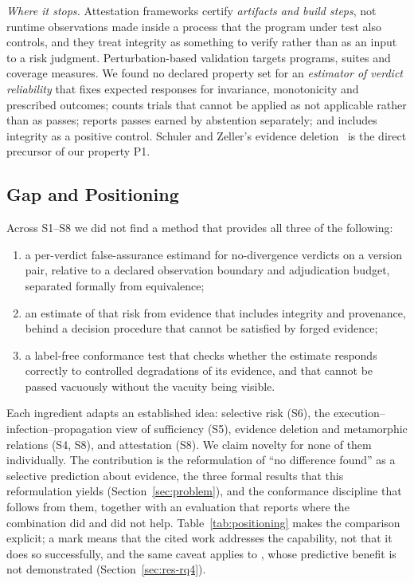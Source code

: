 \emph{Where it stops.} Attestation frameworks certify \emph{artifacts and build steps}, not runtime observations made inside a process that the program under test also controls, and they treat integrity as something to verify rather than as an input to a risk judgment. Perturbation-based validation targets programs, suites and coverage measures. We found no declared property set for an \emph{estimator of verdict reliability} that fixes expected responses for invariance, monotonicity and prescribed outcomes; counts trials that cannot be applied as not applicable rather than as passes; reports passes earned by abstention separately; and includes integrity as a positive control. Schuler and Zeller's evidence deletion~\cite{schuler2011assessing} is the direct precursor of our property P1.

\subsection{Gap and Positioning}
Across S1--S8 we did not find a method that provides all three of the following:
\begin{enumerate}
\item a per-verdict false-assurance estimand for no-divergence verdicts on a version pair, relative to a declared observation boundary and adjudication budget, separated formally from equivalence;
\item an estimate of that risk from evidence that includes integrity and provenance, behind a decision procedure that cannot be satisfied by forged evidence;
\item a label-free conformance test that checks whether the estimate responds correctly to controlled degradations of its evidence, and that cannot be passed vacuously without the vacuity being visible.
\end{enumerate}
Each ingredient adapts an established idea: selective risk (S6), the execution--infection--propagation view of sufficiency (S5), evidence deletion and metamorphic relations (S4, S8), and attestation (S8). We claim novelty for none of them individually. The contribution is the reformulation of ``no difference found'' as a selective prediction about evidence, the three formal results that this reformulation yields (Section~\ref{sec:problem}), and the conformance discipline that follows from them, together with an evaluation that reports where the combination did and did not help. Table~\ref{tab:positioning} makes the comparison explicit; a mark means that the cited work addresses the capability, not that it does so successfully, and the same caveat applies to \sbg{}, whose predictive benefit is not demonstrated (Section~\ref{sec:res-rq4}).

